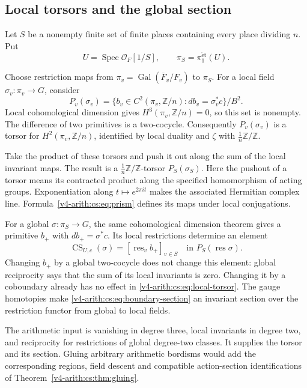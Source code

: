 \subsection{Local torsors and the global section}

Let \(S\) be a nonempty finite set of finite places containing every place
dividing \(n\). Put
\[
 U=\operatorname{Spec}\mathcal O_F[1/S],\qquad
 \pi_S=\pi_1^{\mathrm{\acute et}}(U).
\]

Choose
restriction maps from \(\pi_v=\operatorname{Gal}(\overline F_v/F_v)\) to
\(\pi_S\). For a local field
\(\sigma_v:\pi_v\to G\), consider
\begin{equation}
 P_v(\sigma_v)=
 \{b_v\in C^2(\pi_v,\mathbb Z/n):db_v=\sigma_v^*c\}/B^2.
 \label{v4-arith:cs:eq:local-torsor}
\end{equation}
Local cohomological dimension gives \(H^3(\pi_v,\mathbb Z/n)=0\), so this
set is nonempty. The difference of two primitives is a two-cocycle.
Consequently \(P_v(\sigma_v)\) is a torsor for \(H^2(\pi_v,\mathbb Z/n)\),
identified by local duality and \(\zeta\) with \(\tfrac1n\mathbb Z/\mathbb
Z\).

Take the product of these torsors and push it out along the sum of the local
invariant maps. The result is a \(\tfrac1n\mathbb Z/\mathbb Z\)-torsor
\(P_S(\sigma_S)\). Here the pushout of a torsor means its contracted product
along the specified homomorphism of acting groups. Exponentiation along
\(t\mapsto e^{2\pi it}\) makes the associated Hermitian complex line.
Formula~\eqref{v4-arith:cs:eq:prism} defines its maps under local
conjugations.

For a global \(\sigma:\pi_S\to G\), the same cohomological dimension theorem
gives a primitive \(b_+\) with \(db_+=\sigma^*c\). Its local restrictions
determine an element
\begin{equation}
 \operatorname{CS}_{U,c}(\sigma)
       =[\operatorname{res}_v b_+]_{v\in S}
       \quad\text{in }P_S(\operatorname{res}\sigma).
 \label{v4-arith:cs:eq:boundary-section}
\end{equation}
Changing \(b_+\) by a global two-cocycle does not change this element:
global reciprocity says that the sum of its local invariants is zero.
Changing it by a coboundary already has no effect in
\eqref{v4-arith:cs:eq:local-torsor}. The gauge homotopies make
\eqref{v4-arith:cs:eq:boundary-section} an invariant section over the
restriction functor from global to local fields.

The arithmetic input is vanishing in degree three, local invariants in
degree two, and reciprocity for restrictions of global degree-two classes.
It supplies the torsor and its section. Gluing arbitrary arithmetic bordisms
would add the corresponding regions, field descent and compatible
action-section identifications of Theorem~\ref{v4-arith:cs:thm:gluing}.

